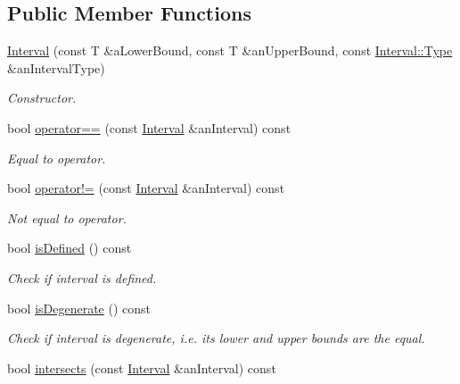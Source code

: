 \subsection*{Public Member Functions}
\begin{DoxyCompactItemize}
\item 
\hyperlink{classostk_1_1math_1_1obj_1_1_interval_adb3c15ff97e0097185ee7f9d2bd79a98}{Interval} (const T \&a\+Lower\+Bound, const T \&an\+Upper\+Bound, const \hyperlink{classostk_1_1math_1_1obj_1_1_interval_base_a0dd9bd29a9bfefa26de9b88ac81de92a}{Interval\+::\+Type} \&an\+Interval\+Type)
\begin{DoxyCompactList}\small\item\em Constructor. \end{DoxyCompactList}\item 
bool \hyperlink{classostk_1_1math_1_1obj_1_1_interval_a0e3495dfad73a385d27621c7969a6f49}{operator==} (const \hyperlink{classostk_1_1math_1_1obj_1_1_interval}{Interval} \&an\+Interval) const
\begin{DoxyCompactList}\small\item\em Equal to operator. \end{DoxyCompactList}\item 
bool \hyperlink{classostk_1_1math_1_1obj_1_1_interval_a7bc7fa4fb1b04aa59337ad8f2704a38d}{operator!=} (const \hyperlink{classostk_1_1math_1_1obj_1_1_interval}{Interval} \&an\+Interval) const
\begin{DoxyCompactList}\small\item\em Not equal to operator. \end{DoxyCompactList}\item 
bool \hyperlink{classostk_1_1math_1_1obj_1_1_interval_a28ed286e10ecfd77bb9145c28c9c7dff}{is\+Defined} () const
\begin{DoxyCompactList}\small\item\em Check if interval is defined. \end{DoxyCompactList}\item 
bool \hyperlink{classostk_1_1math_1_1obj_1_1_interval_a55edb92a6b3bfed37e60b016bd3a3e60}{is\+Degenerate} () const
\begin{DoxyCompactList}\small\item\em Check if interval is degenerate, i.\+e. its lower and upper bounds are the equal. \end{DoxyCompactList}\item 
bool \hyperlink{classostk_1_1math_1_1obj_1_1_interval_a58c2b405e2c5606cb774efac35bbd624}{intersects} (const \hyperlink{classostk_1_1math_1_1obj_1_1_interval}{Interval} \&an\+Interval) const

\end{DoxyCompactItemize}
